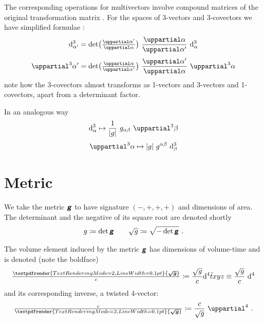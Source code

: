 \documentclass[\ifafour a4paper,12pt,\else a5paper,10pt,\fi%
onecolumn,oneside,article,%
british%
]{memoir}
\theoremstyle{remark}
\theoremstyle{innote}
\newcommand*{\mathte}[1]{\textbf{\textit{\textsf{#1}}}}
\renewcommand*{\bm}[1]{\textpdfrender{TextRenderingMode=2,LineWidth=0.1pt}{\boldsymbol{#1}}}
\newcommand*{\de}{\uppartial}%
\newcommand*{\di}{\mathrm{d}}%
\newcommand*{\defd}{\coloneqq}
\DeclarePairedDelimiter\abs{\lvert}{\rvert}
\renewcommand*{\|}[1][]{\nonscript\:#1\vert\nonscript\:\mathopen{}}
\newcommand*{\sect}{\S}%
\newcommand*{\eqn}{eq.}%
\newcommand*{\ssssi}[1]{\di^{4}{#1}}
\newcommand*{\tw}[1]{\tilde{#1}}
\newcommand*{\ttte}[1]{\de^{3}{#1}}
\newcommand*{\tttte}[1]{\de^{4}{#1}}
\newcommand*{\ttti}[1]{\di^{3}_{#1}}
\newcommand*{\tttti}[1]{\di^{4}_{#1}}
\newcommand*{\yg}{\mathte{g}}
\newcommand*{\dg}{\sqrt{g}}
\newcommand*{\ve}{\tfrac{\bm{\sqrt{g}}}{c}}
\newcommand*{\vi}{\tfrac{c}{\bm{\sqrt{g}}}}
\begin{document}
The corresponding operations for multivectors involve {compound matrices} of the original transformation matrix \autocites[\sect~IV.A.1 p.~199]{choquetbruhatetal1977_r1996}. For the spaces of 3-vectors and 3-covectors we have simplified formulae \autocites[\sect~I.4 \eqn~(33)]{gantmacher1959_r2000}:
\begin{equation}
  \label{eq:transf3_simple}
  \begin{gathered}
    \ttti{\alpha'} =
    \det\bigl(
    \tfrac{\de \alpha'}{\de \alpha}
    \bigr)
    \ 
    \frac{\de \alpha}{\de \alpha'}
    \ 
    \ttti{\alpha}
    \\[\jot]
    \ttte{\alpha'} =
    \det\bigl(
    \tfrac{\de \alpha}{\de \alpha'}
    \bigr)
    \ 
    \frac{\de \alpha'}{\de \alpha}
    \ 
    \ttte{\alpha}
  \end{gathered}
\end{equation}
note how the 3-covectors almost transforms as 1-vectors and 3-vectors and 1-covectors, apart from a determinant factor.

In an analogous way
\begin{equation}
  \label{eq:raise3_simple}
  \begin{gathered}
    \ttti{\alpha}
    \mapsto
\frac{1}{\abs{g}}\ g_{\alpha\beta}\
    \ttte{\beta}
    \\[\jot]
    \ttte{\alpha}
    \mapsto
\abs{g}\ g^{\alpha\beta}\
    \ttti{\beta}
  \end{gathered}
\end{equation}


\section{Metric}
\label{sec:metric}

We take the metric $\yg$ to have signature $(-,+,+,+)$ and dimensions of area. The determinant and the negative of its square root are denoted shortly
\begin{equation}
  \label{eq:det_g}
  g\defd \det\yg
  \qquad
\dg \defd \sqrt{-\det\yg} \ .
\end{equation}

The volume element induced by the metric $\yg$ has dimensions of volume-time and is denoted (note the boldface)
\begin{equation}
  \label{eq:vol_element}
  \ve \defd \frac{\dg}{c} \ssssi{\tw{t}xyz} \equiv \frac{\dg}{c}\ \tttti{}
\end{equation}
and its corresponding inverse, a twisted 4-vector:
\begin{equation}
  \label{eq:inv_vol_element}
  \vi \defd \frac{c}{\dg}\ \tttte{} \ .
\end{equation}
\end{document}
